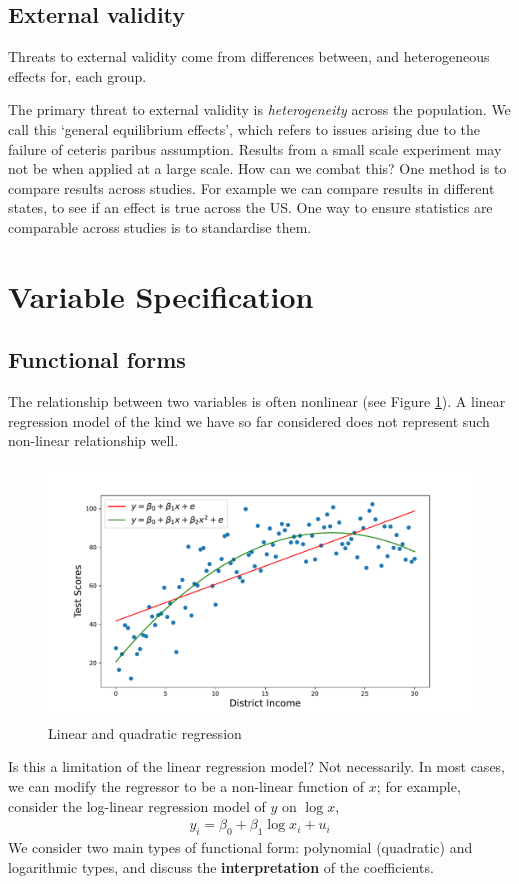         \subsection{External validity}
            Threats to external validity come from differences between, and heterogeneous effects for, each group. 

            The primary threat to external validity is \textit{heterogeneity} across the population. We call this `general equilibrium effects', which refers to issues arising due to the failure of ceteris paribus assumption. Results from a small scale experiment may not be when applied at a large scale. How can we combat this? One method is to compare results across studies. For example we can compare results in different states, to see if an effect is true across the US. One way to ensure statistics are comparable across studies is to standardise them.



    \section{Variable Specification}

        \subsection{Functional forms}
            The relationship between two variables is often nonlinear (see Figure \ref{fig:research/spec/quad}). A linear regression model of the kind we have so far considered does not represent such non-linear relationship well. 
            \begin{figure}[h]
                \centering
                \includegraphics[width=0.8\linewidth]{figures/quadratic_regression.pdf}
                \caption{Linear and quadratic regression}
                \label{fig:research/spec/quad}
            \end{figure}
            Is this a limitation of the linear regression model? Not necessarily. In most cases, we can modify the regressor to be a non-linear function of $x$; for example, consider the log-linear regression model of $y$ on $\log x$,
            \begin{align}
                y_i = \beta_0 + \beta_1 \log x_i + u_i
            \end{align}
            We consider two main types of functional form: polynomial (quadratic) and logarithmic types, and discuss the \textbf{interpretation} of the coefficients.

